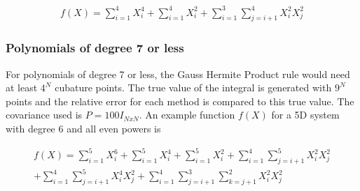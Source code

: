 \documentclass[letterpaper, 10 pt, conference]{ieeeconf}  %
\begin{document}
\setlength{\arraycolsep}{0.0em}
\begin{eqnarray}
f(X)=\sum_{i=1}^4{X_i^4}+\sum_{i=1}^4{X_i^2}+\sum_{i=1}^3{\sum_{j=i+1}^4{X_i^2X_j^2}}
\end{eqnarray}
\setlength{\arraycolsep}{5pt}



\subsubsection{Polynomials of degree 7 or less}
For polynomials of degree 7 or less, the Gauss Hermite Product rule would need at least $4^N$ cubature points. The true value of the integral is generated with $9^N$ points and the relative error for each method is compared to this true value. The covariance used is $P=100I_{NxN}$. An example function $f(X)$ for a 5D system with degree 6 and all even powers is 

\setlength{\arraycolsep}{0.0em}
\begin{eqnarray}
f(X)=\sum_{i=1}^5{X_i^6}+\sum_{i=1}^5{X_i^4}+\sum_{i=1}^5{X_i^2}+\sum_{i=1}^4{\sum_{j=i+1}^5{X_i^2X_j^2}}\\
+\sum_{i=1}^4{\sum_{j=i+1}^5{X_i^4X_j^2}}+\sum_{i=1}^4{\sum_{j=i+1}^3{\sum_{k=j+1}^2{X_i^2X_j^2}}}
\end{eqnarray}
\setlength{\arraycolsep}{5pt}
\end{document}
